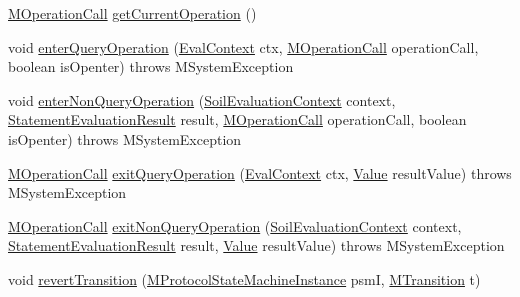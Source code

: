 \begin{DoxyCompactItemize}
\item 
\hyperlink{classorg_1_1tzi_1_1use_1_1uml_1_1sys_1_1_m_operation_call}{M\-Operation\-Call} \hyperlink{classorg_1_1tzi_1_1use_1_1uml_1_1sys_1_1_m_system_af690b657e5b7116c4d3ef03f1ce4bd56}{get\-Current\-Operation} ()
\item 
void \hyperlink{classorg_1_1tzi_1_1use_1_1uml_1_1sys_1_1_m_system_ac108dfabab530c7c94fb4999fdd2f3b6}{enter\-Query\-Operation} (\hyperlink{classorg_1_1tzi_1_1use_1_1uml_1_1ocl_1_1expr_1_1_eval_context}{Eval\-Context} ctx, \hyperlink{classorg_1_1tzi_1_1use_1_1uml_1_1sys_1_1_m_operation_call}{M\-Operation\-Call} operation\-Call, boolean is\-Openter)  throws M\-System\-Exception 
\item 
void \hyperlink{classorg_1_1tzi_1_1use_1_1uml_1_1sys_1_1_m_system_a79f113ebdf857232f9ab9452eb965dee}{enter\-Non\-Query\-Operation} (\hyperlink{classorg_1_1tzi_1_1use_1_1uml_1_1sys_1_1soil_1_1_soil_evaluation_context}{Soil\-Evaluation\-Context} context, \hyperlink{classorg_1_1tzi_1_1use_1_1uml_1_1sys_1_1_statement_evaluation_result}{Statement\-Evaluation\-Result} result, \hyperlink{classorg_1_1tzi_1_1use_1_1uml_1_1sys_1_1_m_operation_call}{M\-Operation\-Call} operation\-Call, boolean is\-Openter)  throws M\-System\-Exception 
\item 
\hyperlink{classorg_1_1tzi_1_1use_1_1uml_1_1sys_1_1_m_operation_call}{M\-Operation\-Call} \hyperlink{classorg_1_1tzi_1_1use_1_1uml_1_1sys_1_1_m_system_a621d1cc63101bca0b13e099e76723759}{exit\-Query\-Operation} (\hyperlink{classorg_1_1tzi_1_1use_1_1uml_1_1ocl_1_1expr_1_1_eval_context}{Eval\-Context} ctx, \hyperlink{classorg_1_1tzi_1_1use_1_1uml_1_1ocl_1_1value_1_1_value}{Value} result\-Value)  throws M\-System\-Exception 
\item 
\hyperlink{classorg_1_1tzi_1_1use_1_1uml_1_1sys_1_1_m_operation_call}{M\-Operation\-Call} \hyperlink{classorg_1_1tzi_1_1use_1_1uml_1_1sys_1_1_m_system_a74fd61315934469b70246efe6cd9c089}{exit\-Non\-Query\-Operation} (\hyperlink{classorg_1_1tzi_1_1use_1_1uml_1_1sys_1_1soil_1_1_soil_evaluation_context}{Soil\-Evaluation\-Context} context, \hyperlink{classorg_1_1tzi_1_1use_1_1uml_1_1sys_1_1_statement_evaluation_result}{Statement\-Evaluation\-Result} result, \hyperlink{classorg_1_1tzi_1_1use_1_1uml_1_1ocl_1_1value_1_1_value}{Value} result\-Value)  throws M\-System\-Exception 
\item 
void \hyperlink{classorg_1_1tzi_1_1use_1_1uml_1_1sys_1_1_m_system_ab0c59b66f00b1728844ab4a134b8bc56}{revert\-Transition} (\hyperlink{classorg_1_1tzi_1_1use_1_1uml_1_1sys_1_1statemachines_1_1_m_protocol_state_machine_instance}{M\-Protocol\-State\-Machine\-Instance} psm\-I, \hyperlink{classorg_1_1tzi_1_1use_1_1uml_1_1mm_1_1statemachines_1_1_m_transition}{M\-Transition} t)

\end{DoxyCompactItemize}
